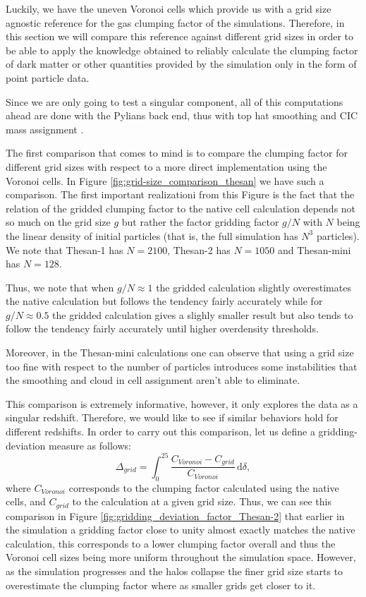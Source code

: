 \documentclass[%
 reprint,
nofootinbib,
 amsmath,amssymb,
 aps,
]{revtex4-2}
\begin{document}
Luckily, we have the uneven Voronoi cells which provide us with a grid size agnostic reference for the gas clumping factor of the simulations. Therefore, in this section we will compare this reference against different grid sizes in order to be able to apply the knowledge obtained to reliably calculate the clumping factor of dark matter or other quantities provided by the simulation only in the form of point particle data. 

Since we are only going to test a singular component, all of this computations ahead are done with the Pylians back end, thus with top hat smoothing and CIC mass assignment \cite{pylians2018}. 

The first comparison that comes to mind is to compare the clumping factor for different grid sizes with respect to a more direct implementation using the Voronoi cells. In Figure \ref{fig:grid-size_comparison_thesan} we have such a comparison. The first important realizationi from this Figure is the fact that the relation of the gridded clumping factor to the native cell calculation depends not so much on the grid size $g$ but rather the factor gridding factor $g/N$ with $N$ being the linear density of initial particles (that is, the full simulation has $N^3$ particles). We note that Thesan-1 has $N=2100$, Thesan-2 has $N=1050$ and Thesan-mini has $N=128$. 

Thus, we note that when $g/N \approx 1$ the gridded calculation slightly overestimates the native calculation but follows the tendency fairly accurately while for $g/N \approx 0.5$ the gridded calculation gives a slighly smaller result but also tends to follow the tendency fairly accurately until higher overdensity thresholds. 

Moreover, in the Thesan-mini calculations one can observe that using a grid size too fine with respect to the number of particles introduces some instabilities that the smoothing and cloud in cell assignment aren't able to eliminate. 

This comparison is extremely informative, however, it only explores the data as a singular redshift. Therefore, we would like to see if similar behaviors hold for different redshifts. In order to carry out this comparison, let us define a gridding-deviation measure as follows:
\begin{equation}
\Delta_{grid} = \int_0^{25} \frac{C_{Voronoi} - C_{grid}}{C_{Voronoi}}\,\mathrm{d}\delta,
\end{equation}
where $C_{Voronoi}$ corresponds to the clumping factor calculated using the native cells, and $C_{grid}$ to the calculation at a given grid size. Thus, we can see this comparison in Figure \ref{fig:gridding_deviation_factor_Thesan-2} that earlier in the simulation a gridding factor close to unity almost exactly matches the native calculation, this corresponds to a lower clumping factor overall and thus the Voronoi cell sizes being more uniform throughout the simulation space. However, as the simulation progresses and the halos collapse the finer grid size starts to overestimate the clumping factor where as smaller grids get closer to it. 
\end{document}
